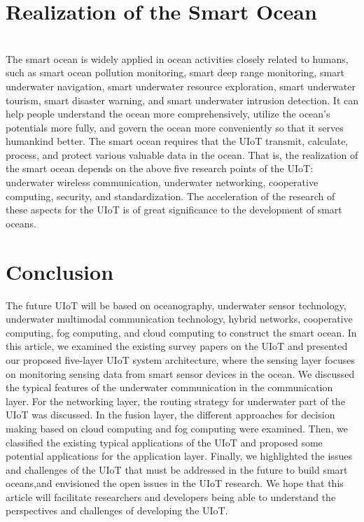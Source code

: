 \documentclass[a4paper,12pt]{article}
\begin{document}
\begin{multicols}{2}
\section{Realization of the Smart Ocean}\\
The smart ocean is widely applied in ocean activities closely related to humans, such as smart ocean pollution monitoring, smart deep range monitoring, smart underwater navigation, smart underwater resource exploration, smart underwater tourism, smart disaster warning, and smart underwater intrusion detection. It can help people understand the ocean more comprehensively, utilize the ocean’s potentials more fully, and govern the ocean more conveniently so that it serves humankind better. The smart ocean requires that the UIoT transmit, calculate, process, and protect various valuable data in the ocean. That is, the realization of the smart ocean depends on the above five research points of the UIoT: underwater wireless communication, underwater networking, cooperative computing, security, and standardization. The acceleration of the research of these aspects for the UIoT is of great significance to the development of smart oceans.\\

\section{Conclusion}
The future UIoT will be based on oceanography, underwater sensor technology, underwater multimodal communication technology, hybrid networks, cooperative computing, fog computing, and cloud computing to construct the smart ocean. In this article, we examined the existing survey papers on the UIoT and presented our proposed five-layer UIoT system architecture, where the sensing layer focuses on monitoring sensing data from smart sensor devices in the ocean. We discussed the typical features of the underwater communication in the communication layer. For the networking layer, the routing strategy for underwater part of the UIoT was discussed. In the fusion layer, the different approaches for decision making based on cloud computing and fog computing were examined. Then, we classified the existing typical applications of the UIoT and proposed some potential applications for the application layer. Finally, we highlighted the issues and challenges of the UIoT that must be addressed in the future to build smart oceans,and envisioned the open issues in the UIoT research. We hope that this article will facilitate researchers and developers being able to understand the perspectives and challenges of developing the UIoT.


\end{multicols}
\end{document}

